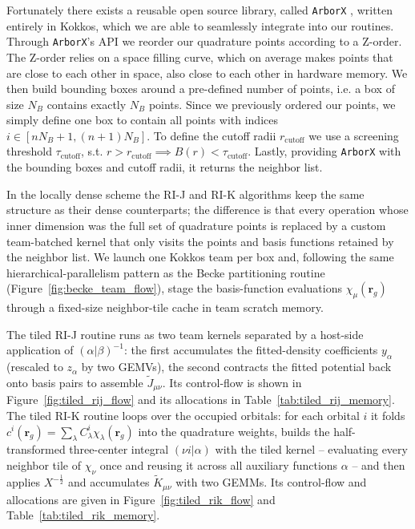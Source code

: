 \documentclass{article}
\begin{document}
Fortunately there exists a reusable open source library, called
\texttt{ArborX} \cite{LebrunGrandie2020, Prokopenko2025}, written
entirely in Kokkos, which we are able to
seamlessly integrate into our routines. Through \texttt{ArborX}'s API
we reorder our quadrature points according to a Z-order. The Z-order
relies on a space filling curve, which on average makes points that
are close to each other in space, also close to each other in
hardware memory. We then build bounding boxes around a pre-defined
number of points, i.e. a box of size \( N_B \) contains exactly \( N_B \)
points. Since we previously ordered our points, we simply define one
box to contain all points with indices \( i \in [nN_B+1, (n+1)N_B]
\). To define the cutoff radii \(  r_\text{cutoff} \) we use a
screening threshold \( \tau_\text{cutoff} \), s.t.
\( r > r_\text{cutoff} \implies B(r) < \tau_\text{cutoff} \).
Lastly, providing \texttt{ArborX} with the
bounding boxes and cutoff radii, it returns the neighbor list.

In the locally dense scheme the RI-J and RI-K algorithms keep the same
structure as their dense counterparts; the difference is that every
operation whose inner dimension was the full set of quadrature points is
replaced by a custom team-batched kernel that only visits the points and
basis functions retained by the neighbor list. We launch one Kokkos team
per box and, following the same hierarchical-parallelism pattern as the
Becke partitioning routine (Figure~\ref{fig:becke_team_flow}), stage the
basis-function evaluations \( \chi_\mu(\mathbf r_g) \) through a fixed-size
neighbor-tile cache in team scratch memory.

The tiled RI-J routine runs as two team kernels separated by a host-side
application of \( (\alpha|\beta)^{-1} \): the first accumulates the
fitted-density coefficients \( y_\alpha \) (rescaled to \( z_\alpha \) by
two GEMVs), the second contracts the fitted potential back onto basis
pairs to assemble \( \tilde J_{\mu\nu} \). Its control-flow is shown in
Figure~\ref{fig:tiled_rij_flow} and its allocations in
Table~\ref{tab:tiled_rij_memory}. The tiled RI-K routine loops over the
occupied orbitals: for each orbital \( i \) it folds \( c^i(\mathbf r_g)
=\sum_\lambda C^i_\lambda \chi_\lambda(\mathbf r_g) \) into the
quadrature weights, builds
the half-transformed three-center integral \( (\nu i|\alpha) \) with the
tiled kernel -- evaluating every neighbor tile of \( \chi_\nu \) once and
reusing it across all auxiliary functions \( \alpha \) -- and then
applies \( X^{-\frac12} \) and accumulates \( \tilde K_{\mu\nu} \) with
two GEMMs. Its control-flow and allocations are given in
Figure~\ref{fig:tiled_rik_flow} and Table~\ref{tab:tiled_rik_memory}.
\end{document}
